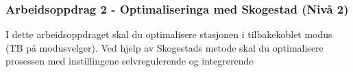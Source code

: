 \subsubsection*{Arbeidsoppdrag 2 - Optimaliseringa med Skogestad (Nivå 2)}


I dette arbeidsoppdraget skal du optimalisere stasjonen i tilbakekoblet modus (TB på modusvelger). Ved hjelp av Skogestads metode skal du optimalisere prosessen med instillingene selvregulerende og integrerende



